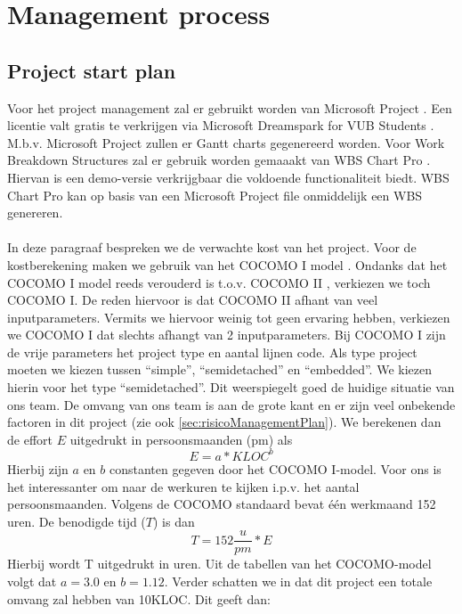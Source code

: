 \chapter{Management process}
\section{Project start plan} \label{sec:ProjectStartPlan}
Voor het project management zal er gebruikt worden van Microsoft Project \cite{MicrosoftProject}. Een licentie valt gratis te verkrijgen via Microsoft Dreamspark for VUB Students \cite{DreamsparkVUB}. M.b.v. Microsoft Project zullen er Gantt charts gegenereerd worden. Voor Work Breakdown Structures zal er gebruik worden gemaaakt van WBS Chart Pro \cite{WBSChartPro}. Hiervan is een demo-versie verkrijgbaar die voldoende functionaliteit biedt. WBS Chart Pro kan op basis van een Microsoft Project file onmiddelijk een WBS genereren.
\\
\\
In deze paragraaf bespreken we de verwachte kost van het project. Voor de kostberekening maken we gebruik van het COCOMO I model \cite{CocomoI}. Ondanks dat het COCOMO I model reeds verouderd is t.o.v. COCOMO II \cite{CocomoII}, verkiezen we toch COCOMO I. De reden hiervoor is dat COCOMO II afhant van veel inputparameters. Vermits we hiervoor weinig tot geen ervaring hebben, verkiezen we COCOMO I dat slechts afhangt van 2 inputparameters. Bij COCOMO I zijn de vrije parameters het project type en aantal lijnen code. Als type project moeten we kiezen tussen ``simple'', ``semidetached'' en ``embedded''. We kiezen hierin voor het type ``semidetached''. Dit weerspiegelt goed de huidige situatie van ons team. De omvang van ons team is aan de grote kant en er zijn veel onbekende factoren in dit project (zie ook \ref{sec:risicoManagementPlan}). We berekenen dan de effort $E$ uitgedrukt in persoonsmaanden (pm) als
\begin{equation*}
	E = a*KLOC^b
\end{equation*}
Hierbij zijn $a$ en $b$ constanten gegeven door het COCOMO I-model. Voor ons is het interessanter om naar de werkuren te kijken i.p.v. het aantal persoonsmaanden. Volgens de COCOMO standaard bevat \'{e}\'{e}n werkmaand 152 uren.  De benodigde tijd ($T$) is dan
\begin{equation*}
	T = 152\frac{u}{pm}*E
\end{equation*}
Hierbij wordt T uitgedrukt in uren. Uit de tabellen van het COCOMO-model volgt dat $a = 3.0$ en $b = 1.12$. Verder schatten we in dat dit project een totale omvang zal hebben van 10KLOC. Dit geeft dan:
